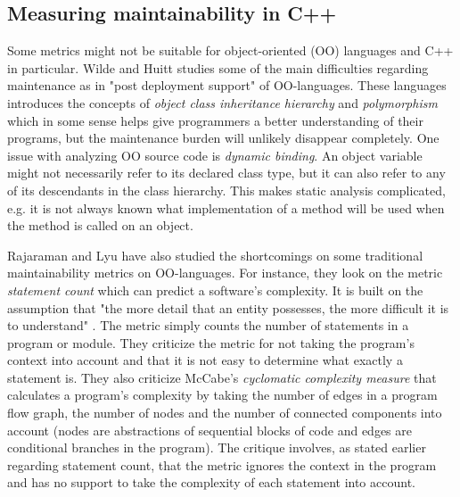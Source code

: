 \subsection{Measuring maintainability in C++}


Some metrics might not be suitable for object-oriented (OO) languages and C++
in particular. Wilde and Huitt \cite{wilde1991maintenance} studies some of the
main difficulties regarding maintenance as in "post deployment support" of
OO-languages. These languages introduces the concepts of \textit{object class
inheritance hierarchy} and \textit{polymorphism} which in some sense helps give
programmers a better understanding of their programs, but the maintenance
burden will unlikely disappear completely. One issue with analyzing OO source
code is \textit{dynamic binding}. An object variable might not necessarily
refer to its declared class type, but it can also refer to any of its
descendants in the class hierarchy. This makes static analysis complicated,
e.g. it is not always known what implementation of a method will be used when
the method is called on an object.

Rajaraman and Lyu \cite{rajaraman1992reliability} have also studied the
shortcomings on some traditional maintainability metrics on OO-languages. For
instance, they look on the metric \textit{statement count} which can predict a
software's complexity. It is built on the assumption that "the more detail that
an entity possesses, the more difficult it is to understand"
\cite{rajaraman1992reliability}. The metric simply counts the number of
statements in a program or module. They criticize the metric for not taking the
program's context into account and that it is not easy to determine what
exactly a statement is. They also criticize McCabe's
\cite{mccabe1976complexity} \textit{cyclomatic complexity measure} that
calculates a program's complexity by taking the number of edges in a program
flow graph, the number of nodes and the number of connected components into
account (nodes are abstractions of sequential blocks of code and edges are
conditional branches in the program). The critique involves, as stated earlier
regarding statement count, that the metric ignores the context in the program
and has no support to take the complexity of each statement into account.

